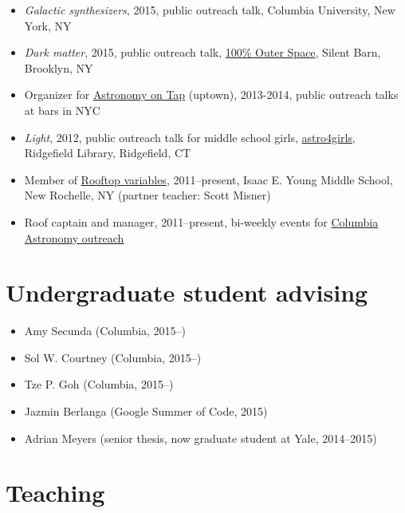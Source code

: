 \documentclass[12pt,letterpaper]{article}
\begin{document}
\begin{itemize}
	\item \emph{Galactic synthesizers}, 2015, public outreach talk, Columbia University, New York, NY
	\item \emph{Dark matter}, 2015, public outreach talk, \href{http://silentbarn.org/2015/03/100-outer-space-party}{100\% Outer Space}, Silent Barn, Brooklyn, NY
	\item Organizer for \href{http://astronomyontap.org/}{Astronomy on Tap} (uptown), 2013-2014, public outreach talks at bars in NYC
	\item \emph{Light}, 2012, public outreach talk for middle school girls, \href{http://www.newstimes.com/news/article/Astronomer-Shoot-for-the-stars-3380793.php}{astro4girls}, Ridgefield Library, Ridgefield, CT
	\item Member of \href{http://rv.astro.columbia.edu}{Rooftop variables}, 2011--present, Isaac E. Young Middle School, New Rochelle, NY (partner teacher: Scott Misner)
	\item Roof captain and manager, 2011--present, bi-weekly events for \href{http://outreach.astro.columbia.edu/}{Columbia Astronomy outreach}

\end{itemize}

\section*{Undergraduate student advising}

\begin{itemize}
	\item Amy Secunda (Columbia, 2015--)
	\item Sol W. Courtney (Columbia, 2015--)
	\item Tze P. Goh (Columbia, 2015--) 
	\item Jazmin Berlanga (Google Summer of Code, 2015)
	\item Adrian Meyers (senior thesis, now graduate student at Yale, 2014--2015)
\end{itemize}

\section*{Teaching}
\end{document}

